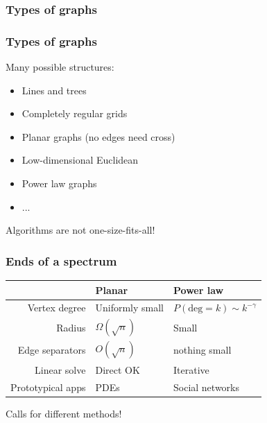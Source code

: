 \documentclass{beamer}
\begin{document}
\begin{frame}
  \frametitle{Types of graphs}

  \begin{center}
    
  \end{center}
\end{frame}

\begin{frame}
  \frametitle{Types of graphs}

  Many possible structures:
  \begin{itemize}
  \item Lines and trees
  \item Completely regular grids
  \item Planar graphs (no edges need cross)
  \item Low-dimensional Euclidean
  \item Power law graphs
  \item ...
  \end{itemize}
  Algorithms are not one-size-fits-all!
\end{frame}

\begin{frame}
  \frametitle{Ends of a spectrum}

  \begin{center}
    \begin{tabular}{r|l|l}
      & Planar & Power law \\ \hline
      Vertex degree & Uniformly small &
      $P(\mathrm{deg} = k) \sim k^{-\gamma}$ \\
      Radius & $\Omega(\sqrt{n})$ & Small \\
      Edge separators & $O(\sqrt{n})$ & nothing small \\
      Linear solve & Direct OK & Iterative \\
      Prototypical apps & PDEs & Social networks
    \end{tabular}

    \vspace{1cm}
    Calls for different methods!
  \end{center}
\end{frame}
\end{document}
